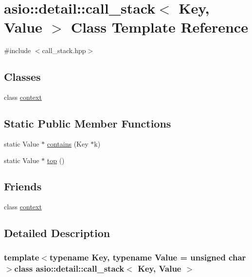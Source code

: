 \hypertarget{classasio_1_1detail_1_1call__stack}{}\section{asio\+:\+:detail\+:\+:call\+\_\+stack$<$ Key, Value $>$ Class Template Reference}
\label{classasio_1_1detail_1_1call__stack}


{\ttfamily \#include $<$call\+\_\+stack.\+hpp$>$}

\subsection*{Classes}
\begin{DoxyCompactItemize}
\item 
class \hyperlink{classasio_1_1detail_1_1call__stack_1_1context}{context}
\end{DoxyCompactItemize}
\subsection*{Static Public Member Functions}
\begin{DoxyCompactItemize}
\item 
static Value $\ast$ \hyperlink{classasio_1_1detail_1_1call__stack_a615354f312e7a38e5eca82a4d59e7950}{contains} (Key $\ast$k)
\item 
static Value $\ast$ \hyperlink{classasio_1_1detail_1_1call__stack_a606704e47633b7b0bcf0d46fc636429f}{top} ()
\end{DoxyCompactItemize}
\subsection*{Friends}
\begin{DoxyCompactItemize}
\item 
class \hyperlink{classasio_1_1detail_1_1call__stack_ac78d499d6bdacfe4cc1f67b4ce865513}{context}
\end{DoxyCompactItemize}


\subsection{Detailed Description}
\subsubsection*{template$<$typename Key, typename Value = unsigned char$>$class asio\+::detail\+::call\+\_\+stack$<$ Key, Value $>$}



